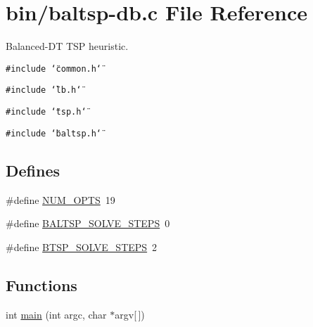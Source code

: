 \hypertarget{bin_2baltsp-db_8c}{
\section{bin/baltsp-db.c File Reference}
\label{bin_2baltsp-db_8c}
}
Balanced-DT TSP heuristic.  


{\tt \#include \char`\"{}common.h\char`\"{}}\par
{\tt \#include \char`\"{}lb.h\char`\"{}}\par
{\tt \#include \char`\"{}tsp.h\char`\"{}}\par
{\tt \#include \char`\"{}baltsp.h\char`\"{}}\par
\subsection*{Defines}
\begin{CompactItemize}
\item 
\#define \hyperlink{bin_2baltsp-db_8c_9b58b2c4af931c8486a986c9deca40f5}{NUM\_\-OPTS}~19
\item 
\#define \hyperlink{bin_2baltsp-db_8c_d9b2b3cc92b48bea976b603f970e8e41}{BALTSP\_\-SOLVE\_\-STEPS}~0
\item 
\#define \hyperlink{bin_2baltsp-db_8c_83255427b2f2f52d715e7b88d97ce089}{BTSP\_\-SOLVE\_\-STEPS}~2
\end{CompactItemize}
\subsection*{Functions}
\begin{CompactItemize}
\item 
int \hyperlink{bin_2baltsp-db_8c_0ddf1224851353fc92bfbff6f499fa97}{main} (int argc, char $\ast$argv\mbox{[}$\,$\mbox{]})
\end{CompactItemize}
